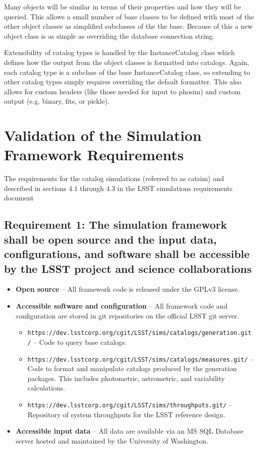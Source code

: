 \documentclass[]{article}
\begin{document}
{Many objects will be similar in terms of their properties and how they will be queried.
This allows a small number of base classes to be defined with most of the other object
classes as simplified subclasses of the the base.
Because of this a new object class is as simple as overriding the database connection string.

Extensibility of catalog types is handled by the InstanceCatalog class which defines how
the output from the object classes is formatted into catalogs.  Again, each catalog
type is a subclass of the base InstanceCatalog class, so extending to other catalog
types simply requires overriding the default formatter.  This also allows for custom headers
(like those needed for input to phosim) and custom output (e.g. binary, fits, or pickle).

\section{Validation of the Simulation Framework Requirements}
The requirements for the catalog simulations (referred to as catsim) and described in sections
4.1 through 4.3 in the LSST simulations requirements document \citep{requirements}

\subsection{Requirement 1: The simulation framework shall be open source and the input data, configurations,
and software shall be accessible by the LSST project and science collaborations}
\begin{itemize}
\item {\bf Open source} -- All framework code is released under the GPLv3 license.
\item {\bf Accessible software and configuration} -- All framework code and configuration are 
stored in git repositories on the official LSST git server.
\begin{itemize}
\item {\tt https://dev.lsstcorp.org/cgit/LSST/sims/catalogs/generation.git/} -- Code to query
base catalogs.
\item {\tt https://dev.lsstcorp.org/cgit/LSST/sims/catalogs/measures.git/} -- Code to format
and manipulate catalogs produced by the generation packages.  This includes photometric, 
astrometric, and variability calculations.
\item {\tt https://dev.lsstcorp.org/cgit/LSST/sims/throughputs.git/} -- Repository
of system throughputs for the LSST reference design.
\end{itemize}
\item {\bf Accessible input data} -- All data are available via an MS SQL Database server
hosted and maintained by the University of Washington.
\end{itemize}

}
\end{document}

